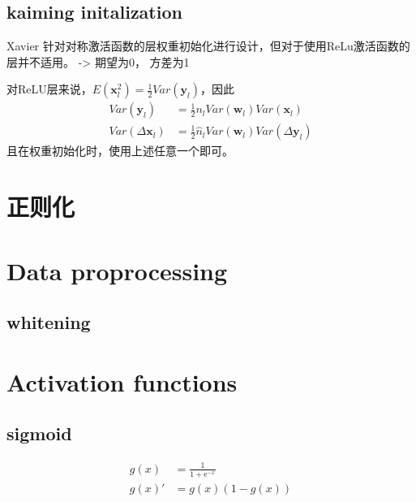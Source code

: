 \subsection{kaiming initalization}
Xavier 针对对称激活函数的层权重初始化进行设计，但对于使用ReLu激活函数的层并不适用\cite{He2015}。
-> 期望为0， 方差为1
\par
对ReLU层来说，$E(\mathbf{x}_l^2) = \frac{1}{2}Var(\mathbf{y}_l)$，因此
\begin{equation}
    \begin{split}
        Var(\mathbf{y}_l) &= \frac{1}{2} n_l Var(\mathbf{w}_l)Var(\mathbf{x}_l) \\
        Var(\Delta{\mathbf{x}_l}) &= \frac{1}{2} \hat n_l Var(\mathbf{w}_l)Var(\Delta{\mathbf{y}}_l)
    \end{split}
\end{equation}
且在权重初始化时，使用上述任意一个即可。

\section{正则化}

\section{Data proprocessing}
\subsection{whitening}

\section{Activation functions}
\subsection{sigmoid}

\begin{equation}
    \begin{split}
        g(x) &= \frac{1}{1+\mathrm{e}^{-x}} \\
        g(x)' &= g(x)(1-g(x))
    \end{split}
\end{equation}

